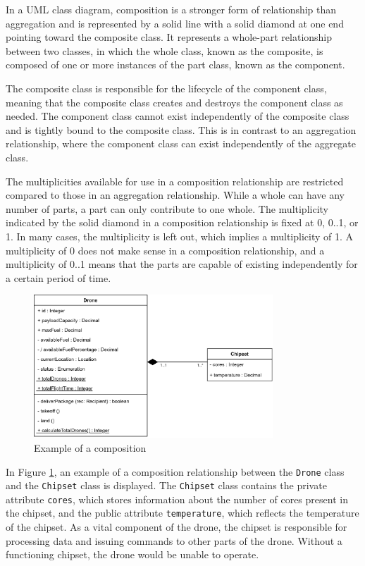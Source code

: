 \documentclass[
	12pt,
    a4paper,
    egregdoesnotlikesansseriftitles, %
    toc=chapterentrywithdots,
    oneside, openany,
    titlepage,
    parskip=half,
    headings=normal,  %
    listof=totoc,
    bibliography=totocnumbered,
    index=totoc,
    captions=tableheading,  %
    listof=flat,
    numbers=noenddot, %
    final]
    {scrbook}
\begin{document}
In a UML class diagram, composition is a stronger form of relationship than aggregation and is represented by a solid line with a solid diamond at one end pointing toward the composite class. It represents a whole-part relationship between two classes, in which the whole class, known as the composite, is composed of one or more instances of the part class, known as the component.

The composite class is responsible for the lifecycle of the component class, meaning that the composite class creates and destroys the component class as needed. The component class cannot exist independently of the composite class and is tightly bound to the composite class. This is in contrast to an aggregation relationship, where the component class can exist independently of the aggregate class.

The multiplicities available for use in a composition relationship are restricted compared to those in an aggregation relationship. While a whole can have any number of parts, a part can only contribute to one whole. The multiplicity indicated by the solid diamond in a composition relationship is fixed at 0, 0..1, or 1. In many cases, the multiplicity is left out, which implies a multiplicity of 1. A multiplicity of 0 does not make sense in a composition relationship, and a multiplicity of 0..1 means that the parts are capable of existing independently for a certain period of time.
 \cite[p. 153-154]{uml}

\begin{figure}[h]
\centering
\includegraphics[width=0.8\textwidth]{figures/aggr_comp/comp.jpg}
\caption[Example composition]{Example of a composition}
\label{fig:composition_example}
\end{figure}


In Figure \ref{fig:composition_example}, an example of a composition relationship between the \texttt{Drone} class and the \texttt{Chipset} class is displayed. The \texttt{Chipset} class contains the private attribute \texttt{cores}, which stores information about the number of cores present in the chipset, and the public attribute \texttt{temperature}, which reflects the temperature of the chipset. As a vital component of the drone, the chipset is responsible for processing data and issuing commands to other parts of the drone. Without a functioning chipset, the drone would be unable to operate.
\end{document}
